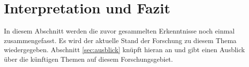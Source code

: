 \section{Interpretation und Fazit}
\label{sec:interpretation}
In diesem Abschnitt werden die zuvor gesammelten Erkenntnisse noch einmal zusammengefasst.
Es wird der aktuelle Stand der Forschung zu diesem Thema wiedergegeben.
Abschnitt \ref{sec:ausblick} knüpft hieran an und gibt einen Ausblick über die künftigen Themen auf diesem Forschungsgebiet.
